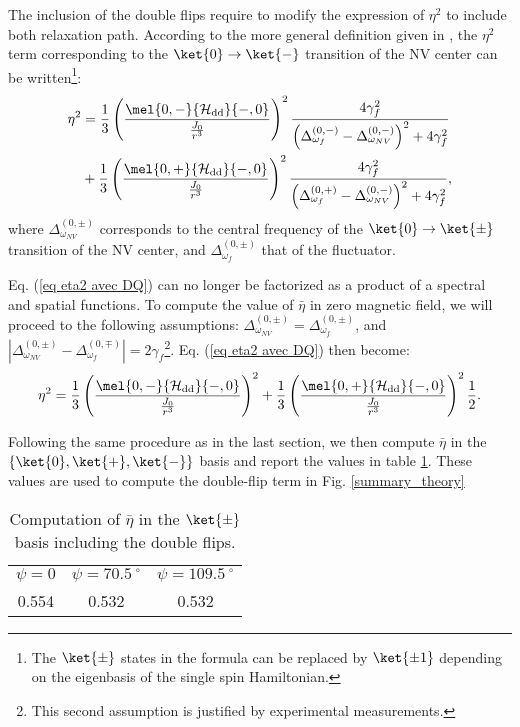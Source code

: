 \documentclass[a4paper, 11pt]{report}
\begin{document}
The inclusion of the double flips require to modify the expression of $\eta^2$ to include both relaxation path. According to the more general definition given in \citep{choi2017depolarization}, the $\eta^2$ term corresponding to the $\ket{0} \to \ket{-}$ transition of the NV center can be written\footnote{The $\ket{\pm}$ states in the formula can be replaced by $\ket{\pm 1}$ depending on the eigenbasis of the single spin Hamiltonian.}:
\begin{align}
\label{eq eta2 avec DQ}
\eta^2&=\frac{1}{3} \left(\frac{\mel{0,-}{\mathcal{H_{\rm dd}}}{-,0}}{\frac{J_0}{r^3}}\right)^2 \frac{4\gamma_f^2}{\left(\Delta_{\omega_f}^{(0,-)} - \Delta_{\omega_{NV}}^{(0,-)}\right)^2+4\gamma_f^2} \nonumber\\
&+\frac{1}{3} \left(\frac{\mel{0,+}{\mathcal{H_{\rm dd}}}{-,0}}{\frac{J_0}{r^3}}\right)^2 \frac{4\gamma_f^2}{\left(\Delta_{\omega_f}^{(0,+)} - \Delta_{\omega_{NV}}^{(0,-)}\right)^2+4\gamma_f^2},
\end{align}
where $\Delta_{\omega_{NV}}^{(0,\pm)}$ corresponds to the central frequency of the $\ket{0} \to \ket{\pm}$ transition of the NV center, and $\Delta_{\omega_{f}}^{(0,\pm)}$ that of the fluctuator.

Eq. (\ref{eq eta2 avec DQ}) can no longer be factorized as a product of a spectral and spatial functions. To compute the value of $\bar \eta$ in zero magnetic field, we will proceed to the following assumptions: $\Delta_{\omega_{NV}}^{(0,\pm)}=\Delta_{\omega_{f}}^{(0,\pm)}$, and $|\Delta_{\omega_{NV}}^{(0,\pm)}-\Delta_{\omega_{f}}^{(0,\mp)}|=2 \gamma_f$\footnote{This second assumption is justified by experimental measurements.}. Eq. (\ref{eq eta2 avec DQ}) then become:
\begin{equation}
\eta^2=\frac{1}{3} \left(\frac{\mel{0,-}{\mathcal{H_{\rm dd}}}{-,0}}{\frac{J_0}{r^3}}\right)^2 
+\frac{1}{3} \left(\frac{\mel{0,+}{\mathcal{H_{\rm dd}}}{-,0}}{\frac{J_0}{r^3}}\right)^2 \frac{1}{2}.
\end{equation}

Following the same procedure as in the last section, we then compute $\bar \eta$ in the $\{ \ket{0}, \ket{+}, \ket{-}\}$ basis and report the values in table \ref{table eta double flip non mag}. These values are used to compute the double-flip term in Fig. \ref{summary_theory}

\begin{table}[htbp]
\centering
\caption{Computation of $\bar \eta$ in the $\ket{\pm}$ basis including the double flips.}
 \label{table eta double flip non mag}
\begin{tabular}{c|c|c}
\toprule
$\psi=0$ & $\psi=70.5 \ ^\circ$ & $\psi=109.5 \ ^\circ$ \\

0.554 & 0.532 & 0.532 \\
\bottomrule
\end{tabular}
\end{table}
\end{document}
